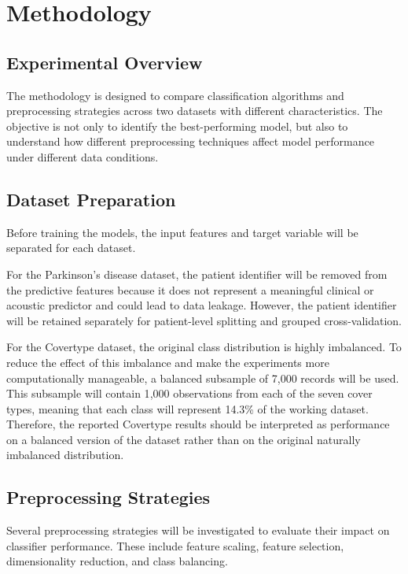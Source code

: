 \documentclass[11pt,a4paper]{article}
\begin{document}
\section{Methodology}

\subsection{Experimental Overview}

The methodology is designed to compare classification algorithms and
preprocessing strategies across two datasets with different characteristics.
The objective is not only to identify the best-performing model, but also to
understand how different preprocessing techniques affect model performance
under different data conditions.

\subsection{Dataset Preparation}

Before training the models, the input features and target variable will be
separated for each dataset.

For the Parkinson's disease dataset, the patient identifier will be removed
from the predictive features because it does not represent a meaningful
clinical or acoustic predictor and could lead to data leakage. However, the
patient identifier will be retained separately for patient-level splitting and
grouped cross-validation.

For the Covertype dataset, the original class distribution is highly
imbalanced. To reduce the effect of this imbalance and make the experiments
more computationally manageable, a balanced subsample of 7{,}000 records will
be used. This subsample will contain 1{,}000 observations from each of the
seven cover types, meaning that each class will represent 14.3\% of the working
dataset. Therefore, the reported Covertype results should be interpreted as
performance on a balanced version of the dataset rather than on the original
naturally imbalanced distribution.

\subsection{Preprocessing Strategies}

Several preprocessing strategies will be investigated to evaluate their impact
on classifier performance. These include feature scaling, feature selection,
dimensionality reduction, and class balancing.
\end{document}
